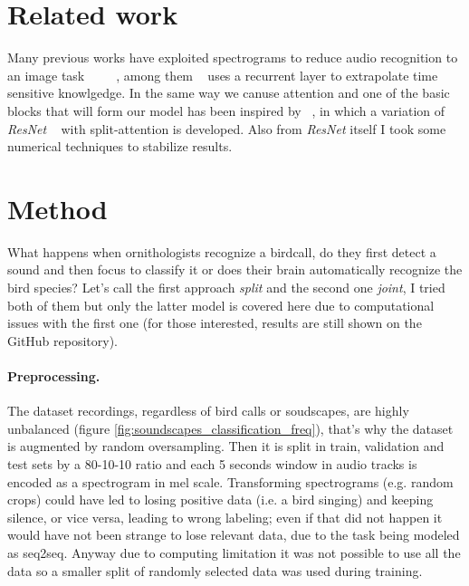 \documentclass{article}
\begin{document}
\section{Related work}
Many previous works have exploited spectrograms to reduce audio recognition to an image task ~\cite{hamdyaudio} ~\cite{michelashvili2020denoising} ~\cite{xie2021audio}, among them ~\cite{xie2021audio} uses a recurrent layer to extrapolate time sensitive knowlgedge.
In the same way we canuse attention and one of the basic blocks that will form our model has been inspired by ~\cite{zhang2020resnest}, in which a variation of \textit{ResNet} ~\cite{he2016deep} with split-attention is developed.
Also from \textit{ResNet} itself I took some numerical techniques to stabilize results.

\section{Method}
What happens when ornithologists recognize a birdcall, do they first detect a sound and then focus to classify it or does their brain automatically recognize the bird species?
Let's call the first approach \textit{split} and the second one \textit{joint}, I tried both of them but only the latter model is covered here due to computational issues with the first one (for those interested, results are still shown on the GitHub repository).

\paragraph*{Preprocessing.}
The dataset recordings, regardless of bird calls or soudscapes, are highly unbalanced (figure \ref{fig:soundscapes_classification_freq}), that's why the dataset is augmented by random oversampling.
Then it is split in train, validation and test sets by a 80-10-10 ratio and each 5 seconds window in audio tracks is encoded as a spectrogram in mel scale.
Transforming spectrograms (e.g. random crops) could have led to losing positive data (i.e. a bird singing) and keeping silence, or vice versa, leading to wrong labeling; even if that did not happen it would have not been strange to lose relevant data, due to the task being modeled as seq2seq.   
Anyway due to computing limitation it was not possible to use all the data so a smaller split of randomly selected data was used during training.
\end{document}
